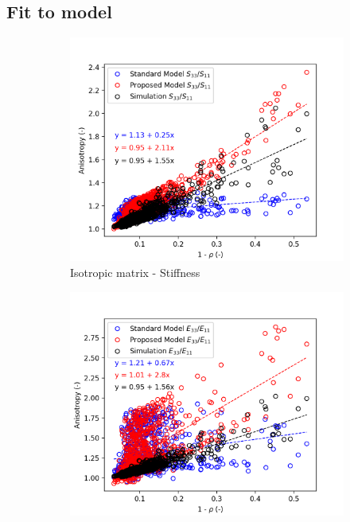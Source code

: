 \documentclass[a4paper,fleqn]{DC_ArtStyle}
\begin{document}
	\subsection{Fit to model}
	\begin{figure}
		\centering
		\begin{subfigure}[b]{0.45\linewidth}
			\includegraphics[width=\linewidth]{Anisotropy_SIsotropic}
			\caption{Isotropic matrix - Stiffness}
		\end{subfigure}
		\begin{subfigure}[b]{0.45\linewidth}
			\includegraphics[width=\linewidth]{Anisotropy_EIsotropic}

\end{subfigure}
\end{figure}
\end{document}
